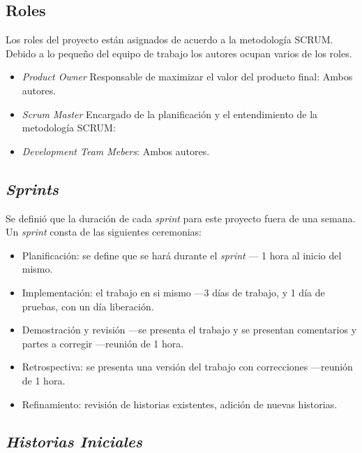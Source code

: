 \subsection{Roles}

Los roles del proyecto están asignados de acuerdo a la metodología SCRUM. Debido a lo pequeño del equipo de trabajo los autores ocupan varios de los roles.

\begin{itemize}
  \item \textit{Product Owner} Responsable de maximizar el valor del producto final: Ambos autores.
  \item \textit{Scrum Master} Encargado de la planificación y el entendimiento de la metodología SCRUM: \atfirstauthor
  \item \textit{Development Team Mebers}: Ambos autores.
\end{itemize}


\subsection{\textit{Sprints}}
\label{sec:sprints}

Se definió que la duración de cada \textit{sprint} para este proyecto fuera de una semana. Un \textit{sprint} consta de las siguientes ceremonias:


\begin{itemize}
  \item Planificación: se define que se hará durante el \textit{sprint} — 1 hora al inicio del mismo.
  \item Implementación: el trabajo en si mismo —3 días de trabajo, y 1 día de pruebas, con un día liberación.  
  \item Demostración y revisión —se presenta el trabajo y se presentan comentarios y partes a corregir —reunión de 1 hora.
  \item Retrospectiva: se presenta una versión del trabajo con correcciones —reunión de 1 hora. 
  \item Refinamiento: revisión de historias existentes, adición de nuevas historias.
\end{itemize}


\subsection{\textit{Historias Iniciales}}

